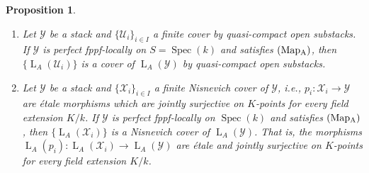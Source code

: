 \documentclass[12pt, oneside]{amsart}
\numberwithin{equation}{section}
\newtheorem{proposition}[subsubsection]{Proposition}
\theoremstyle{remark}
\theoremstyle{plain}
\newcommand{\Loop}{\operatorname{L}}
\newcommand{\YY}{\mathcal{Y}}
\newcommand{\XX}{\mathcal{X}}
\DeclareMathOperator{\spc}{Spec}
\newcommand{\UU}{\mathcal{U}}
\begin{document}
\begin{proposition}\label{eff epi}\leavevmode
\begin{enumerate}
\item
Let $\YY$ be a stack and $\{\UU_i\}_{i \in I}$ a finite cover by quasi-compact open substacks.
If $\YY$ is perfect fppf-locally on $S=\spc(k)$ and satisfies $(\textup{Map}\textsubscript{A})$, then $\{\Loop_A(\UU_i)\}$ is a cover of $\Loop_A(\YY)$ by quasi-compact open substacks.

\item
Let $\YY$ be a stack and $\{\XX_i\}_{i \in I}$ a finite Nisnevich cover of $\YY$, i.e., $p_i : \XX_i \to \YY$ are étale morphisms which are jointly surjective on $K$-points for every field extension $K/k$.
If $\YY$ is perfect fppf-locally on $\spc(k)$ and satisfies $(\textup{Map}\textsubscript{A})$, then $\{\Loop_A(\XX_i)\}$ is a Nisnevich cover of $\Loop_A(\YY)$.
That is, the morphisms $\Loop_A(p_i) : \Loop_A(\XX_i) \to \Loop_A(\YY)$ are \'etale and jointly surjective on $K$-points for every field extension $K/k$.
\end{enumerate}
\end{proposition}
\end{document}
